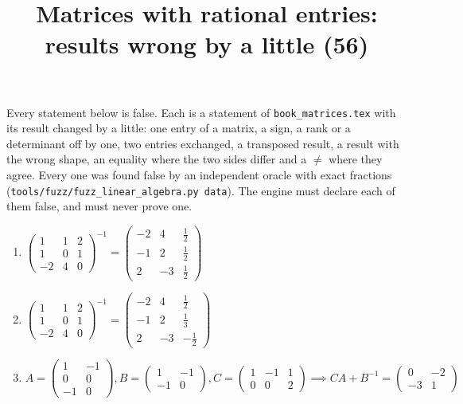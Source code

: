 \documentclass[11pt,a4paper]{article}
\title{Matrices with rational entries: results wrong by a little (56)}
\author{}
\date{}
\begin{document}
\maketitle
Every statement below is false. Each is a statement of \texttt{book\_matrices.tex} with its result changed by a little: one entry of a matrix, a sign, a rank or a determinant off by one, two entries exchanged, a transposed result, a result with the wrong shape, an equality where the two sides differ and a $\neq$ where they agree. Every one was found false by an independent oracle with exact fractions (\texttt{tools/fuzz/fuzz\_linear\_algebra.py data}). The engine must declare each of them false, and must never prove one.

\begin{enumerate}
\item $\displaystyle \begin{pmatrix} 1 & 1 & 2 \\ 1 & 0 & 1 \\ -2 & 4 & 0 \end{pmatrix}^{-1} = \begin{pmatrix} -2 & 4 & \frac{1}{2} \\ -1 & 2 & \frac{1}{2} \\ 2 & -3 & \frac{1}{2} \end{pmatrix}$
\item $\displaystyle \begin{pmatrix} 1 & 1 & 2 \\ 1 & 0 & 1 \\ -2 & 4 & 0 \end{pmatrix}^{-1} = \begin{pmatrix} -2 & 4 & \frac{1}{2} \\ -1 & 2 & \frac{1}{3} \\ 2 & -3 & -\frac{1}{2} \end{pmatrix}$
\item $\displaystyle A = \begin{pmatrix} 1 & -1 \\ 0 & 0 \\ -1 & 0 \end{pmatrix}, B = \begin{pmatrix} 1 & -1 \\ -1 & 0 \end{pmatrix}, C = \begin{pmatrix} 1 & -1 & 1 \\ 0 & 0 & 2 \end{pmatrix} \implies C A + B^{-1} = \begin{pmatrix} 0 & -2 \\ -3 & 1 \end{pmatrix}$

\end{enumerate}
\end{document}
